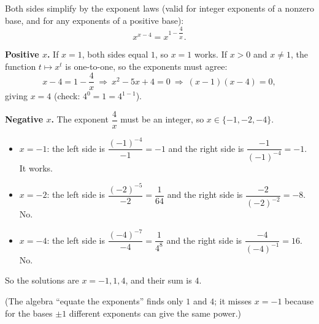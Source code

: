 Both sides simplify by the exponent laws (valid for integer exponents of a nonzero base, and for any exponents of a positive base):
\[x^{x-4}=x^{1-\dfrac{4}{x}}.\]

\textbf{Positive $x$.} If $x=1$, both sides equal $1$, so $x=1$ works. If $x>0$ and $x\ne1$, the function $t\mapsto x^t$ is one-to-one, so the exponents must agree:
\[x-4=1-\dfrac{4}{x}\ \Longrightarrow\ x^2-5x+4=0\ \Longrightarrow\ (x-1)(x-4)=0,\]
giving $x=4$ (check: $4^0=1=4^{1-1}$).

\textbf{Negative $x$.} The exponent $\dfrac{4}{x}$ must be an integer, so $x\in\{-1,-2,-4\}$.
\begin{itemize}
\item $x=-1$: the left side is $\dfrac{(-1)^{-4}}{-1}=-1$ and the right side is $\dfrac{-1}{(-1)^{-4}}=-1$. It works.
\item $x=-2$: the left side is $\dfrac{(-2)^{-5}}{-2}=\dfrac{1}{64}$ and the right side is $\dfrac{-2}{(-2)^{-2}}=-8$. No.
\item $x=-4$: the left side is $\dfrac{(-4)^{-7}}{-4}=\dfrac{1}{4^8}$ and the right side is $\dfrac{-4}{(-4)^{-1}}=16$. No.
\end{itemize}

So the solutions are $x=-1,1,4$, and their sum is $\boxed{4}$.

(The algebra ``equate the exponents'' finds only $1$ and $4$; it misses $x=-1$ because for the bases $\pm1$ different exponents can give the same power.)
